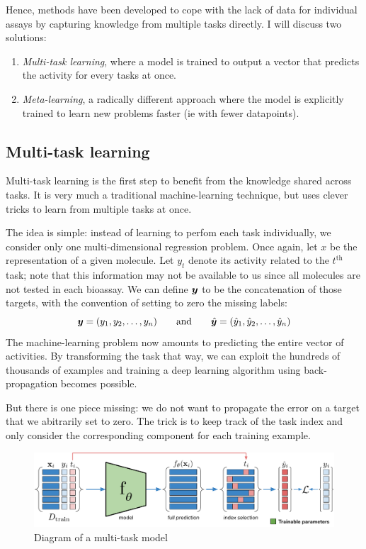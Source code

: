 \documentclass[11pt]{article}
\numberwithin{equation}{subsection}
\begin{document}
Hence, methods have been developed to cope with the lack of data for individual assays by capturing knowledge from multiple tasks directly. I will discuss two solutions:
\begin{enumerate}
  \item \textit{Multi-task learning}, where a model is trained to output a vector that predicts the activity for every tasks at once.
  \item \textit{Meta-learning}, a radically different approach where the model is explicitly trained to learn new problems faster (ie with fewer datapoints).
\end{enumerate}



\subsection{Multi-task learning}
\label{sec:multitask}

Multi-task learning is the first step to benefit from the knowledge shared across tasks. It is very much a traditional machine-learning technique, but uses clever tricks to learn from multiple tasks at once.

The idea is simple: instead of learning to perfom each task individually, we consider only one multi-dimensional regression problem. Once again, let $x$ be the representation of a given molecule. Let $y_t$ denote its activity related to the $t^\text{th}$ task; note that this information may not be available to us since all molecules are not tested in each bioassay. We can define ${\bm{y}}$ to be the concatenation of those targets, with the convention of setting to zero the missing labels:
\begin{equation}
  {\bm{y}} = (y_1, y_2, \dots, y_n) \qquad \text{and} \qquad \hat{{\bm{y}}} = (\hat{y}_1, \hat{y}_2, \dots, \hat{y}_n)
\end{equation}
The machine-learning problem now amounts to predicting the entire vector of activities. By transforming the task that way, we can exploit the hundreds of thousands of examples and training a deep learning algorithm using back-propagation becomes possible.

But there is one piece missing: we do not want to propagate the error on a target that we abitrarily set to zero. The trick is to keep track of the task index and only consider the corresponding component for each training example.

\begin{figure}[ht]
  \includegraphics[width=.9\textwidth,center]{scoring/multitask}
  \caption{Diagram of a multi-task model}
  \label{fig:multitask}
\end{figure}
\end{document}
